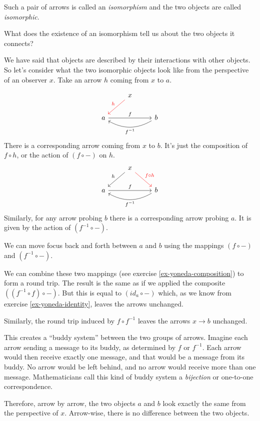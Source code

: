 \documentclass[DaoFP]{subfiles}
\begin{document}
Such a pair of arrows is called an \emph{isomorphism} and the two objects are called \emph{isomorphic}.

What does the existence of an isomorphism tell us about the two objects it connects? 

We have said that objects are described by their interactions with other objects. So let's consider what the two isomorphic objects look like from the perspective of an observer  $x$. Take an arrow $h$ coming from $x$ to $a$.

\[
 \begin{tikzcd}
 & x
 \arrow[ld, red, "h"']
 \\
 a
 \arrow[rr, "f"]
  && b
 \arrow[ll, bend left,  "f^{-1}"]
 \end{tikzcd}
\]
There is a corresponding arrow coming from $x$ to $b$. It's just the composition of $f \circ h$, or the action of $(f \circ -)$ on $h$.
\[
 \begin{tikzcd}
 & x
 \arrow[ld, "h"']
 \arrow[rd, red, "f \circ h"]
 \\
 a
 \arrow[rr, "f"]
  && b
 \arrow[ll, bend left,  "f^{-1}"]
 \end{tikzcd}
\]
Similarly, for any arrow probing $b$ there is a corresponding arrow probing $a$. It is given by the action of  $(f^{-1} \circ -)$. 

We can move focus back and forth between $a$ and $b$ using the mappings $(f \circ -)$ and $(f^{-1} \circ -)$.

We can combine these two mappings (see exercise \ref{ex-yoneda-composition}) to form a round trip. The result is the same as if we applied the composite $((f^{-1} \circ f) \circ -)$. But this is equal to $(id_a \circ  -)$ which, as we know from exercise \ref{ex-yoneda-identity}, leaves the arrows unchanged.

Similarly, the round trip induced by $f \circ f^{-1}$ leaves the arrows $x \to b$ unchanged. 

This creates a ``buddy system'' between the two groups of arrows. Imagine each arrow sending a message to its buddy, as determined by $f$ or $f^{-1}$. Each arrow would then receive exactly one message, and that would be a message from its buddy. No arrow would be left behind, and no arrow would receive more than one message. Mathematicians call this kind of buddy system a \emph{bijection} or one-to-one correspondence.

Therefore, arrow by arrow, the two objects $a$ and $b$ look exactly the same from the perspective of $x$. Arrow-wise, there is no difference between the two objects. 
\end{document}
